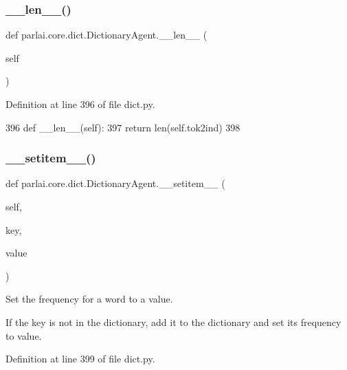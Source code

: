 \subsubsection{\texorpdfstring{\+\_\+\+\_\+len\+\_\+\+\_\+()}{\_\_len\_\_()}}
{\footnotesize\ttfamily def parlai.\+core.\+dict.\+Dictionary\+Agent.\+\_\+\+\_\+len\+\_\+\+\_\+ (\begin{DoxyParamCaption}\item[{}]{self }\end{DoxyParamCaption})}



Definition at line 396 of file dict.\+py.


\begin{DoxyCode}
396     \textcolor{keyword}{def }\_\_len\_\_(self):
397         \textcolor{keywordflow}{return} len(self.tok2ind)
398 
\end{DoxyCode}
\mbox{\label{classparlai_1_1core_1_1dict_1_1DictionaryAgent_a43dfd6220ded966731b62bca37333dec}} 
\subsubsection{\texorpdfstring{\+\_\+\+\_\+setitem\+\_\+\+\_\+()}{\_\_setitem\_\_()}}
{\footnotesize\ttfamily def parlai.\+core.\+dict.\+Dictionary\+Agent.\+\_\+\+\_\+setitem\+\_\+\+\_\+ (\begin{DoxyParamCaption}\item[{}]{self,  }\item[{}]{key,  }\item[{}]{value }\end{DoxyParamCaption})}

\begin{DoxyVerb}Set the frequency for a word to a value.

If the key is not in the dictionary, add it to the dictionary and set its
frequency to value.
\end{DoxyVerb}
 

Definition at line 399 of file dict.\+py.


